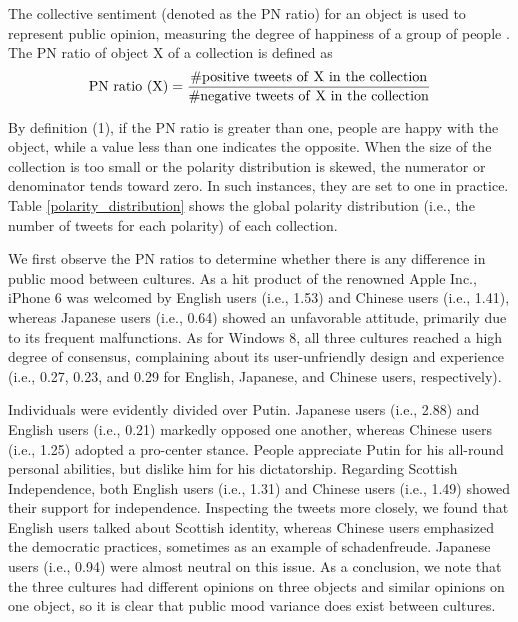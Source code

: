 \documentclass[english]{jnlp_1.4}
\begin{document}
The collective sentiment (denoted as the PN ratio) for an object is used to represent public opinion, measuring the degree of happiness of a group of people \cite{Brendan10,Lu15}. The PN ratio of object X of a collection is defined as
\begin{equation}
{\rm PN\ ratio\ (X) = \frac{\#positive\ tweets\ of\ X\ in\ the\ collection}{\#negative\ tweets\ of\ X\ in\ the\ collection}}
\end{equation}

By definition (1), if the PN ratio is greater than one, people are happy with the object, while a value less than one indicates the opposite. When the size of the collection is too small or the polarity distribution is skewed, the numerator or denominator tends toward zero. In such instances, they are set to one in practice. Table \ref{polarity_distribution} shows the global polarity distribution (i.e., the number of tweets for each polarity) of each collection.

We first observe the PN ratios to determine whether there is any difference in public mood between cultures. As a hit product of the renowned Apple Inc., iPhone 6 was welcomed by English users (i.e., 1.53) and Chinese users (i.e., 1.41), whereas Japanese users (i.e., 0.64) showed an unfavorable attitude, primarily due to its frequent malfunctions. As for Windows 8, all three cultures reached a high degree of consensus, complaining about its user-unfriendly design and experience (i.e., 0.27, 0.23, and 0.29 for English, Japanese, and Chinese users, respectively).

Individuals were evidently divided over Putin. Japanese users (i.e., 2.88) and English users (i.e., 0.21) markedly opposed one another, whereas Chinese users (i.e., 1.25) adopted a pro-center stance. People appreciate Putin for his all-round personal abilities, but dislike him for his dictatorship. Regarding Scottish Independence, both English users (i.e., 1.31) and Chinese users (i.e., 1.49) showed their support for independence. Inspecting the tweets more closely, we found that English users talked about Scottish identity, whereas Chinese users emphasized the democratic practices, sometimes as an example of schadenfreude. Japanese users (i.e., 0.94) were almost neutral on this issue. As a conclusion, we note that the three cultures had different opinions on three objects and similar opinions on one object, so it is clear that public mood variance does exist between cultures.
\end{document}
